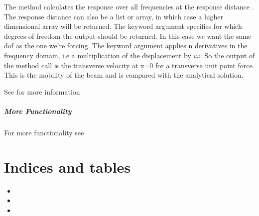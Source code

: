 \documentclass[letterpaper,10pt,english]{sphinxmanual}
\begin{document}
\sphinxAtStartPar
The  method calculates the response over all frequencies at the response distance . The response distance can also be a list or array, in which case a higher dimensional array will be returned.
The  keyword argument specifies for which degrees of freedom the output should be returned. In this case we want the same dof as the one we’re forcing. The  keyword argument applies n derivatives in the
frequency domain, i.e a multiplication of the displacement by \(i \omega\). So the output of the method call is the transverse velocity at x=0 for a transverse unit point force. This is the mobility of the beam and is compared
with the analytical solution.


\sphinxAtStartPar
See {\hyperref[\detokenize{model:pywfe.Model.transfer_function}]{}} for more information


\paragraph{More Functionality}
\label{\detokenize{examples/analytical_beam:more-functionality}}
\sphinxAtStartPar
For more functionality see {\hyperref[\detokenize{model:pywfe.Model}]{}}


\chapter{Indices and tables}
\label{\detokenize{index:indices-and-tables}}\begin{itemize}
\item {} 
\sphinxAtStartPar
{}

\item {} 
\sphinxAtStartPar
{}

\item {} 
\sphinxAtStartPar
{}

\end{itemize}
\end{document}
